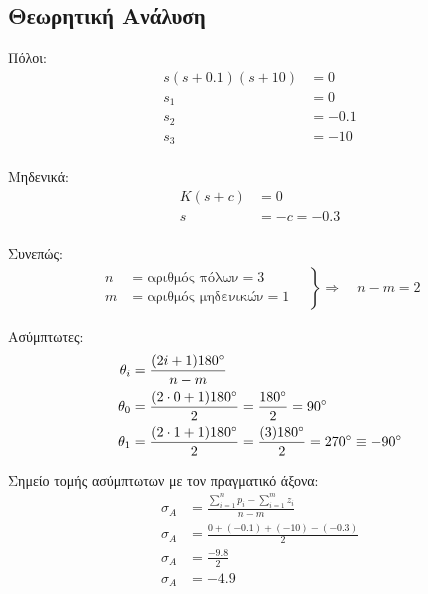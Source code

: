 \documentclass[12pt]{report}
\begin{document}
\subsection{Θεωρητική Ανάλυση}
Πόλοι:  
\begin{align*}
    s(s+0.1)(s+10) &= 0 \\
    s_1 &= 0 \\
    s_2 &= -0.1 \\
    s_3 &= -10 \\
\end{align*}

Μηδενικά:
\begin{align*}
    K(s+c) &= 0 \\
    s &= -c = -0.3 \\
\end{align*}

Συνεπώς:
\begin{align*}
    \left.
    \begin{aligned}
        n &= \text{αριθμός πόλων} = 3 \\
        m &= \text{αριθμός μηδενικών} = 1 
    \end{aligned}
    \quad
    \right\}
    \Rightarrow 
    \quad
    n-m = 2
\end{align*}

Ασύμπτωτες:
\begin{align*} %
    \theta_i &= \frac{(2i+1)180\degree}{n-m} \\
    \theta_0 &= \frac{(2 \cdot 0+1)180\degree}{2} = \frac{180\degree}{2} = 90\degree \\
    \theta_1 &= \frac{(2 \cdot 1+1)180\degree}{2} = \frac{(3)180\degree}{2} = 270\degree \equiv -90\degree\\
\end{align*}

Σημείο τομής ασύμπτωτων με τον πραγματικό άξονα:
\begin{align*}
    \sigma_A &= \frac{\sum_{i=1}^{n} p_i - \sum_{i=1}^{m} z_i}{n-m} \\
    \sigma_A &= \frac{0 + (-0.1) + (-10) - (-0.3)}{2} \\
    \sigma_A &= \frac{-9.8}{2} \\
    \sigma_A &= -4.9
\end{align*}
\end{document}
